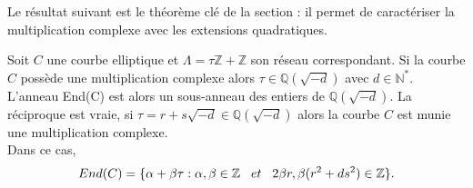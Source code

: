 \documentclass[a4paper]{article}
\begin{document}
\noindent Le résultat suivant est le théorème clé de la section : il permet de caractériser la multiplication complexe avec les extensions quadratiques.


\begin{theorem}  \label{theoo1}
Soit $C$ une courbe elliptique et $\Lambda=\tau \mathbb{Z}+\mathbb{Z}$ son réseau correspondant.
Si la courbe $C$ possède une multiplication complexe alors $\tau \in \mathbb{Q}(\sqrt{-d})$ avec $d \in \mathbb{N}^*$.
L'anneau End(C) est alors un sous-anneau des entiers de $\mathbb{Q}(\sqrt{-d})$. La réciproque est vraie, 
si $\tau=r+s\sqrt{-d} \in \mathbb{Q}(\sqrt{-d})$ alors la courbe $C$ est munie une multiplication complexe. \\
 Dans ce cas,
\begin{equation*}
End(C)=\{\alpha+\beta\tau : \alpha,\beta \in \mathbb{Z} \hspace{0.3cm} et \hspace{0.3cm} 2\beta r,\beta (r^2+ds^2)\in \mathbb{Z} \}.
\end{equation*}
\end{theorem}
\end{document}
